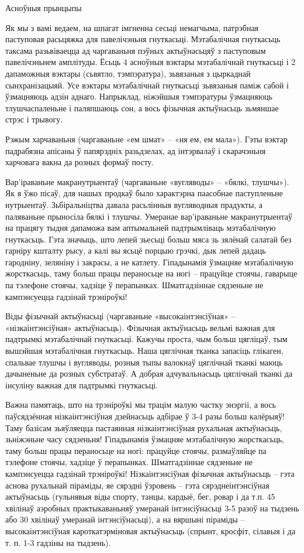 Асноўныя прынцыпы

Як мы з вамі ведаем, на шпагат імгненна сесьці немагчыма, патрэбная паступовая расьцяжка для павелічэньня гнуткасьці. Мэтабалічная гнуткасьць таксама разьвіваецца ад чаргаваньня пэўных актыўнасьцяў з паступовым павелічэньнем амплітуды. Ёсьць 4 асноўныя вэктары мэтабалічнай гнуткасьці і 2 дапаможныя вэктары (сьвятло, тэмпэратура), зьвязаныя з цыркаднай сынхранізацыяй. Усе вэктары мэтабалічнай гнуткасьці зьвязаныя паміж сабой і ўзмацняюць адзін аднаго. Напрыклад, ніжэйшыя тэмпэратуры ўзмацняюць тлушчаспаленьне і паляпшаюць сон, а вось фізычная актыўнасьць зьмяншае стрэс і трывогу.

Рэжым харчаваньня (чаргаваньне «ем шмат» – «ня ем, ем мала»).
Гэты вэктар падрабязна апісаны ў папярэдніх разьдзелах, ад інтэрвалаў і скарачэньня харчовага вакна да розных формаў посту.

Вар'іраваньне макранутрыентаў (чаргаваньне «вугляводы» – «бялкі, тлушчы»).
Як я ўжо пісаў, для нашых продкаў было характэрна паасобнае паступленьне нутрыентаў. Зьбіральніцтва давала расьлінныя вугляводныя прадукты, а паляваньне прыносіла бялкі і тлушчы. Умеранае вар'іраваньне макранутрыентаў на працягу тыдня дапаможа вам аптымальней падтрымліваць мэтабалічную гнуткасьць. Гэта значыць, што лепей зьесьці больш мяса зь зялёнай салатай без гарніру кшталту рысу, а калі вы ясьцё порцыю грэчкі, дык лепей дадаць гародніну, зеляніну і закрасы, а не катлету.
Гіпадынамія ўзмацняе мэтабалічную жорсткасьць, таму больш працы пераносьце на ногі – працуйце стоячы, гаварыце па тэлефоне стоячы, хадзіце ў перапынках. Шматгадзіннае сядзеньне не кампэнсуецца гадзінай трэніроўкі!

Віды фізычнай актыўнасьці (чаргаваньне «высокаінтэнсіўная» – «нізкаінтэнсіўная» актыўнасьць).
Фізычная актыўнасьць вельмі важная для падтрымкі мэтабалічнай гнуткасьці. Кажучы проста, чым больш цягліцаў, тым вышэйшая мэтабалічная гнуткасьць. Наша цяглічная тканка запасіць глікаген, спальвае тлушчы і вугляводы, розныя тыпы валокнаў цяглічнай тканкі маюць дачыненьне да розных субстратаў. А добрая адчувальнасьць цяглічнай тканкі да інсуліну важная для падтрымкі гнуткасьці.

Важна памятаць, што на трэніроўкі мы трацім малую частку энэргіі, а вось паўсядзённая нізкаінтэнсіўная дзейнасьць адбірае ў 3-4 разы больш калёрыяў! Таму базісам зьяўляецца пастаянная нізкаінтэнсіўная рухальная актыўнасьць, зьніжэньне часу сядзеньня! Гіпадынамія ўзмацняе мэтабалічную жорсткасьць, таму больш працы пераносьце на ногі: працуйце стоячы, размаўляйце па тэлефоне стоячы, хадзіце ў перапынках. Шматгадзіннае сядзеньне не кампэнсуецца гадзінай трэніроўкі! Нізкаінтэнсіўная фізычная актыўнасьць – гэта аснова рухальнай піраміды, яе сярэдні ўзровень – гэта сярэднеінтэнсіўная актыўнасьць (гульнявыя віды спорту, танцы, кардыё, бег, ровар і да т.п. 45 хвілінаў аэробных практыкаваньняў умеранай інтэнсіўнасьці 3-5 разоў на тыдзень або 30 хвілінаў умеранай інтэнсіўнасьці), а на вяршыні піраміды – высокаінтэнсіўная кароткатэрміновая актыўнасьць (спрынт, кросфіт, сілавыя і да т. п. 1-3 гадзіны на тыдзень).


